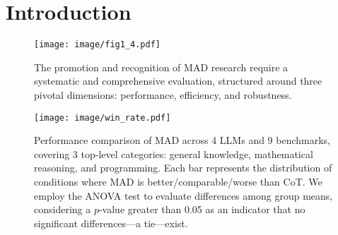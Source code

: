 

\section{Introduction}
\begin{figure}[ht]
    \centering
    \texttt{[image: image/fig1\_4.pdf]}
    \caption{The promotion and recognition of MAD research require a systematic and comprehensive evaluation, structured around three pivotal dimensions: performance, efficiency, and robustness. }
    \label{fig:1}
\end{figure}

\begin{figure*}[htbp]
    \centering
    \texttt{[image: image/win\_rate.pdf]}
    \caption{Performance comparison of MAD across 4 LLMs and 9 benchmarks, covering 3 top-level categories: general knowledge, mathematical reasoning, and programming. Each bar represents the distribution of conditions where MAD is better/comparable/worse than CoT. We employ the ANOVA test to evaluate differences among group means, considering a $p$-value greater than 0.05 as an indicator that no significant differences---a tie---exist. 
    }
    \label{fig:main_pie}
\end{figure*}



